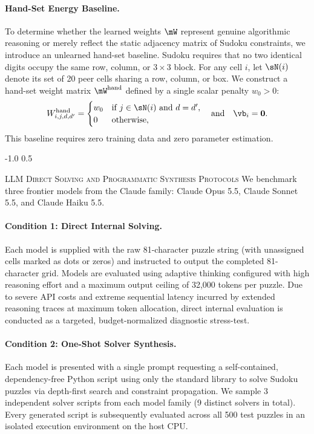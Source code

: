 \documentclass{article} %
\makeatletter
\renewcommand{\subsection}{\@startsection{subsection}{2}{\z@}%
  {-1.0\baselineskip}%
  {0.5\baselineskip}%
  {\normalfont\fontsize{10}{11}\selectfont\raggedright\scshape}}
\makeatother
\begin{document}
\paragraph{Hand-Set Energy Baseline.}
To determine whether the learned weights $\mW$ represent genuine algorithmic reasoning or merely reflect the static adjacency matrix of Sudoku constraints, we introduce an unlearned hand-set baseline. Sudoku requires that no two identical digits occupy the same row, column, or $3 \times 3$ block. For any cell $i$, let $\sN(i)$ denote its set of 20 peer cells sharing a row, column, or box. We construct a hand-set weight matrix $\mW^{\text{hand}}$ defined by a single scalar penalty $w_0 > 0$:
\begin{equation}
W^{\text{hand}}_{i,j,d,d'} = \begin{cases}
w_0 & \text{if } j \in \sN(i) \text{ and } d = d', \\
0 & \text{otherwise},
\end{cases}
\quad \text{and} \quad \vb_i = \mathbf{0}.
\label{eq:handset}
\end{equation}
This baseline requires zero training data and zero parameter estimation.

\subsection{\textsc{LLM Direct Solving and Programmatic Synthesis Protocols}}
\label{sec:llm_protocols}
We benchmark three frontier models from the Claude family: Claude Opus 5.5, Claude Sonnet 5.5, and Claude Haiku 5.5.

\paragraph{Condition 1: Direct Internal Solving.}
Each model is supplied with the raw 81-character puzzle string (with unassigned cells marked as dots or zeros) and instructed to output the completed 81-character grid. Models are evaluated using adaptive thinking configured with high reasoning effort and a maximum output ceiling of 32,000 tokens per puzzle. Due to severe API costs and extreme sequential latency incurred by extended reasoning traces at maximum token allocation, direct internal evaluation is conducted as a targeted, budget-normalized diagnostic stress-test.

\paragraph{Condition 2: One-Shot Solver Synthesis.}
Each model is presented with a single prompt requesting a self-contained, dependency-free Python script using only the standard library to solve Sudoku puzzles via depth-first search and constraint propagation. We sample 3 independent solver scripts from each model family (9 distinct solvers in total). Every generated script is subsequently evaluated across all 500 test puzzles in an isolated execution environment on the host CPU.
\end{document}
